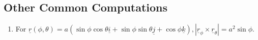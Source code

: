 \documentclass[12pt,a4paper]{article}
\theoremstyle{definition}
\theoremstyle{remark}
\begin{document}
\subsection{Other Common Computations}
\begin{enumerate}
	\item For $ \underline{r}(\phi, \theta) = 
		a(\sin{\phi}\cos{\theta} \underline{i} +
		\sin{\phi}\sin{\theta} \underline{j} + 
		\cos{\phi} \underline{k}), 
		|\underline{r}_{\phi} \times \underline{r}_{\theta}| = 
		a^2\sin{\phi}$.


\end{enumerate}
\end{document}
